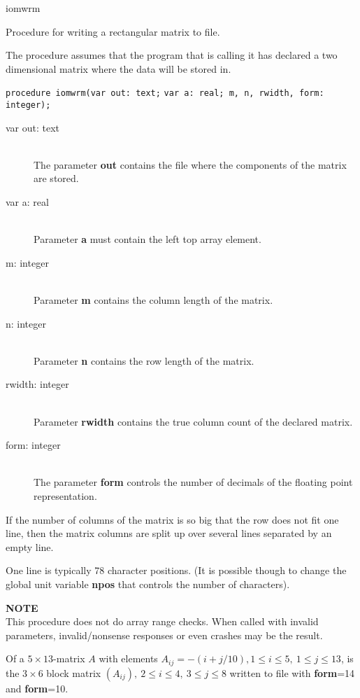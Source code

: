 \documentclass{report}
\newcommand{\FunctionDescription}{\item[Description]\rmfamily}
\newcommand{\Dataorganisation}{\item[Data Struct]\rmfamily}
\newcommand{\DeclarationandParams}{\item[Declaration]\rmfamily}
\newcommand{\Remarks}{\item[Remarks]\rmfamily}
\newcommand{\Example}{\item[Example]\rmfamily}
\begin{document}
\begin{procedure}{iomwrm}

\FunctionDescription Procedure for writing a rectangular matrix to
file.

\Dataorganisation The procedure assumes that the program that is
calling it has declared a two dimensional matrix where the data will
be stored in.

\DeclarationandParams \lstinline|procedure iomwrm(var out: text;|
\lstinline|var a: real; m, n, rwidth, form: integer);|

\begin{description}
 \item[var out: text] \mbox{} \\
   The parameter {\bf out} contains the file where the components of the matrix are stored.
 \item[var a: real] \mbox{} \\
   Parameter {\bf a} must contain the left top array element.
 \item[m: integer] \mbox{} \\
   Parameter {\bf m} contains the column length of the matrix.
 \item[n: integer] \mbox{} \\
   Parameter {\bf n} contains the row length of the matrix.
 \item[rwidth: integer] \mbox{} \\
   Parameter {\bf rwidth} contains the true column count of the declared matrix.
 \item[form: integer] \mbox{} \\
   The parameter {\bf form} controls the number of decimals of the floating point representation.
\end{description}

\Remarks If the number of columns of the matrix is so big that the
row does not fit one line, then the matrix columns are split up over
several lines separated by an empty line.

One line is typically 78 character positions. (It is possible though
to change the global unit variable {\bf npos} that controls the
number of characters).

{\bf NOTE} \\
  This procedure does not do array range checks. When called with invalid
  parameters, invalid/nonsense responses or even crashes may be the result.

\Example Of a $5 \times 13$-matrix $A$ with elements
$A_{ij}=-(i+j/10), 1 \leq i \leq 5,\ 1 \leq j \leq 13$, is the $3
\times 6$ block matrix $(A_{ij}), \ 2 \leq i \leq 4, \ 3 \leq j \leq
8$ written to file with {\bf form}=14 and {\bf form}=10.


\end{procedure}
\end{document}
